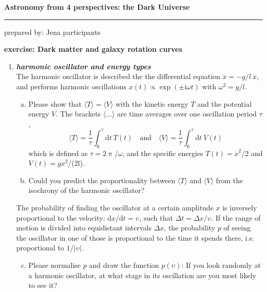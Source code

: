 \documentclass[a4paper,12pt]{article}
\newcommand{\question}[1]{\textbf{\textit{#1}}}
\newcommand{\HRule}{\rule{\linewidth}{0.3mm}}
\newcommand{\dd}{\mathrm{d}}
\renewcommand{\pi}{\uppi}
\newcommand{\ci}{\mathrm{i}}
\newcommand{\bra}{\langle}
\newcommand{\ket}{\rangle}
\begin{document}
\pagestyle{empty}

\begin{center}
\LARGE \textbf{Astronomy from 4 perspectives: the Dark Universe}
\HRule
\end{center}
\begin{flushright}
prepared by: Jena participants
\end{flushright}
\begin{center}
{\Large \textbf{exercise: Dark matter and galaxy rotation curves}}
\end{center}
\vspace{5mm}

\begin{enumerate}


\item \question{harmonic oscillator and energy types}\\
The harmonic oscillator is described the the differential equation $\ddot{x} = -g/l\: x$, and performs harmonic oscillations $x(t)\propto\exp(\pm\ci\omega t)$ with $\omega^2 = g/l$.
\begin{enumerate}[(a)]
\item{Please show that $\bra T\ket = \bra V\ket$ with the kinetic energy $T$ and the potential energy $V$. The brackets $\bra\ldots\ket$ are time averages over one oscillation period $\tau$,
\begin{equation}
\bra T\ket = \frac{1}{\tau}\int_0^\tau\dd t\:T(t)
\quad\mathrm{and}\quad
\bra V\ket = \frac{1}{\tau}\int_0^\tau\dd t\:V(t)
\end{equation}
which is defined as $\tau = 2\pi/\omega$, and the specific energies $T(t) = \dot{x}^2/2$ and $V(t) = gx^2$/(2l).}
\item{Could you predict the proportionality between $\bra T\ket$ and $\bra V\ket$ from the isochrony of the harmonic oscillator?}
\end{enumerate}
The probability of finding the oscillator at a certain amplitude $x$ is inversely proportional to the velocity: $\dd x/\dd t = \upsilon$, such that $\Delta t = \Delta x/\upsilon$. If the range of motion is divided into equidistant intervals $\Delta x$, the probability $p$ of seeing the oscillator in one of those is proportional to the time it spends there, i.e. proportional to $1/\left|\upsilon\right|$.
\begin{enumerate}[(a)]
\setcounter{enumii}{2}
\item{Please normalise $p$ and draw the function $p(\upsilon)$: If you look randomly at a harmonic oscillator, at what stage in its oscillation are you most likely to see it?}

\end{enumerate}
\end{enumerate}
\end{document}
